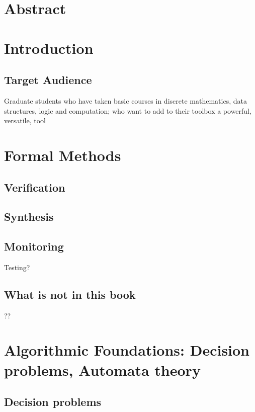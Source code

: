 \documentclass{book}
\begin{document}
 \frontmatter
\chapter*{Abstract}


\mainmatter      


\setcounter{tocdepth}{3}
\tableofcontents



\chapter{Introduction}
\section{Target Audience}
Graduate students who have taken basic courses in discrete mathematics, data structures, logic and computation;
who want to add to their toolbox a powerful, versatile, tool

\chapter{Formal Methods}

\section{Verification}

\section{Synthesis}

\section{Monitoring}

Testing?
\section{What is not in this book}

??

\chapter{Algorithmic Foundations: Decision problems, Automata theory}

\section{Decision problems}
\end{document}

